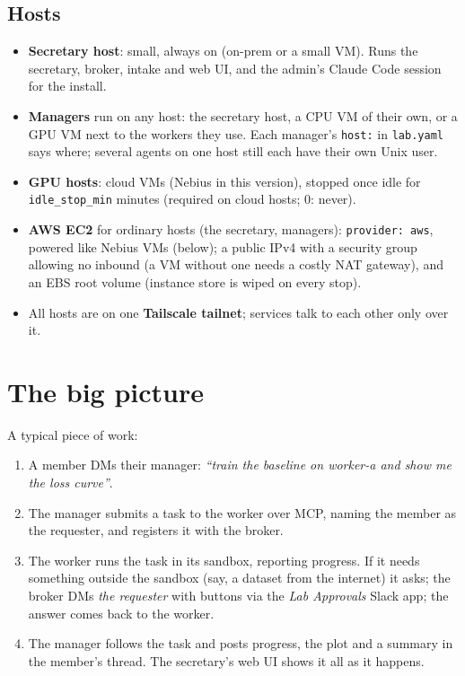 \documentclass[11pt]{article}
\newcommand{\code}[1]{\texttt{#1}}
\begin{document}
\subsection{Hosts}
\begin{itemize}
  \item \textbf{Secretary host}: small, always on (on-prem or a small VM). Runs the
    secretary, broker, intake and web UI, and the admin's Claude Code session for the
    install.
  \item \textbf{Managers} run on any host: the secretary host, a CPU VM of their own, or a
    GPU VM next to the workers they use. Each manager's \code{host:} in \code{lab.yaml}
    says where; several agents on one host still each have their own Unix user.
  \item \textbf{GPU hosts}: cloud VMs (Nebius in this version), stopped once idle for
    \code{idle\_stop\_min} minutes (required on cloud hosts; 0: never).
  \item \textbf{AWS EC2} for ordinary hosts (the secretary, managers): \code{provider: aws},
    powered like Nebius VMs (below); a public IPv4 with a
    security group allowing no inbound (a VM without one needs a costly NAT gateway), and
    an EBS root volume (instance store is wiped on every stop).
  \item All hosts are on one \textbf{Tailscale tailnet}; services talk to each other only
    over it.
\end{itemize}

\section{The big picture}

A typical piece of work:
\begin{enumerate}
  \item A member DMs their manager: \emph{``train the baseline on worker-a and show me the
    loss curve''}.
  \item The manager submits a task to the worker over MCP, naming the member as the
    requester, and registers it with the broker.
  \item The worker runs the task in its sandbox, reporting progress. If it needs something
    outside the sandbox (say, a dataset from the internet) it asks; the broker DMs
    \emph{the requester} with buttons via the \emph{Lab Approvals} Slack app; the answer
    comes back to the worker.
  \item The manager follows the task and posts progress, the plot and a summary in the
    member's thread. The secretary's web UI shows it all as it happens.
\end{enumerate}
\end{document}

